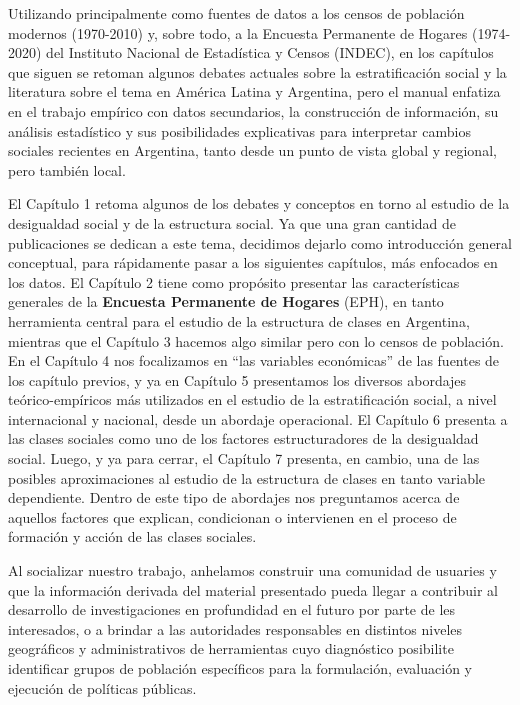 \documentclass[
]{book}
\begin{document}
Utilizando principalmente como fuentes de datos a los censos de población modernos (1970-2010) y, sobre todo, a la Encuesta Permanente de Hogares (1974-2020) del Instituto Nacional de Estadística y Censos (INDEC), en los capítulos que siguen se retoman algunos debates actuales sobre la estratificación social y la literatura sobre el tema en América Latina y Argentina, pero el manual enfatiza en el trabajo empírico con datos secundarios, la construcción de información, su análisis estadístico y sus posibilidades explicativas para interpretar cambios sociales recientes en Argentina, tanto desde un punto de vista global y regional, pero también local.

El Capítulo 1 retoma algunos de los debates y conceptos en torno al estudio de la desigualdad social y de la estructura social. Ya que una gran cantidad de publicaciones se dedican a este tema, decidimos dejarlo como introducción general conceptual, para rápidamente pasar a los siguientes capítulos, más enfocados en los datos. El Capítulo 2 tiene como propósito presentar las características generales de la \textbf{Encuesta Permanente de Hogares} (EPH), en tanto herramienta central para el estudio de la estructura de clases en Argentina, mientras que el Capítulo 3 hacemos algo similar pero con lo censos de población. En el Capítulo 4 nos focalizamos en ``las variables económicas'' de las fuentes de los capítulo previos, y ya en Capítulo 5 presentamos los diversos abordajes teórico-empíricos más utilizados en el estudio de la estratificación social, a nivel internacional y nacional, desde un abordaje operacional. El Capítulo 6 presenta a las clases sociales como uno de los factores estructuradores de la desigualdad social. Luego, y ya para cerrar, el Capítulo 7 presenta, en cambio, una de las posibles aproximaciones al estudio de la estructura de clases en tanto variable dependiente. Dentro de este tipo de abordajes nos preguntamos acerca de aquellos factores que explican, condicionan o intervienen en el proceso de formación y acción de las clases sociales.

Al socializar nuestro trabajo, anhelamos construir una comunidad de usuaries y que la información derivada del material presentado pueda llegar a contribuir al desarrollo de investigaciones en profundidad en el futuro por parte de les interesados, o a brindar a las autoridades responsables en distintos niveles geográficos y administrativos de herramientas cuyo diagnóstico posibilite identificar grupos de población específicos para la formulación, evaluación y ejecución de políticas públicas.
\end{document}
